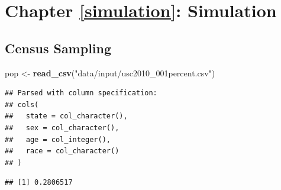 \documentclass[]{book}
\newenvironment{Shaded}{\begin{snugshade}}{\end{snugshade}}
\newcommand{\DataTypeTok}[1]{\textcolor[rgb]{0.13,0.29,0.53}{#1}}
\newcommand{\KeywordTok}[1]{\textcolor[rgb]{0.13,0.29,0.53}{\textbf{#1}}}
\newcommand{\NormalTok}[1]{#1}
\newcommand{\OperatorTok}[1]{\textcolor[rgb]{0.81,0.36,0.00}{\textbf{#1}}}
\newcommand{\StringTok}[1]{\textcolor[rgb]{0.31,0.60,0.02}{#1}}
\theoremstyle{definition}
\theoremstyle{definition}
\theoremstyle{definition}
\theoremstyle{remark}
\begin{document}
\begin{Shaded}
\begin{Highlighting}[]
\begin{Shaded}
\begin{Highlighting}[]
\begin{Shaded}
\begin{Highlighting}[]
\begin{Shaded}
\begin{Highlighting}[]
{{{{\NormalTok{answer }\OperatorTok{+}\StringTok{ }\KeywordTok{geom_line}\NormalTok{(}\DataTypeTok{data =}\NormalTok{mean_polity_no_mid, }\KeywordTok{aes}\NormalTok{(}\DataTypeTok{x =}\NormalTok{ year, }\DataTypeTok{y =}\NormalTok{ mean_polity_mid), }\DataTypeTok{col =} \StringTok{"indianred"}\NormalTok{) }\OperatorTok{+}\StringTok{ }\KeywordTok{geom_line}\NormalTok{(}\DataTypeTok{data =}\NormalTok{mean_polity_yes_mid, }\KeywordTok{aes}\NormalTok{(}\DataTypeTok{x =}\NormalTok{ year, }\DataTypeTok{y =}\NormalTok{ mean_polity_mid), }\DataTypeTok{col =} \StringTok{"dodgerblue"}\NormalTok{)}
\end{Highlighting}
\end{Shaded}

\hypertarget{chapter-refsimulation-simulation}{%
\section{Chapter \ref{simulation}: Simulation}\label{chapter-refsimulation-simulation}}

\hypertarget{census-sampling-1}{%
\subsection{Census Sampling}\label{census-sampling-1}}

\begin{Shaded}
\begin{Highlighting}[]
\NormalTok{pop <-}\StringTok{ }\KeywordTok{read_csv}\NormalTok{(}\StringTok{"data/input/usc2010_001percent.csv"}\NormalTok{)}
\end{Highlighting}
\end{Shaded}

\begin{verbatim}
## Parsed with column specification:
## cols(
##   state = col_character(),
##   sex = col_character(),
##   age = col_integer(),
##   race = col_character()
## )
\end{verbatim}

\begin{Shaded}
\end{Shaded}

\begin{verbatim}
## [1] 0.2806517
\end{verbatim}


\end{Highlighting}
\end{Shaded}
\end{Highlighting}
\end{Shaded}
\end{Highlighting}
\end{Shaded}
\end{document}
